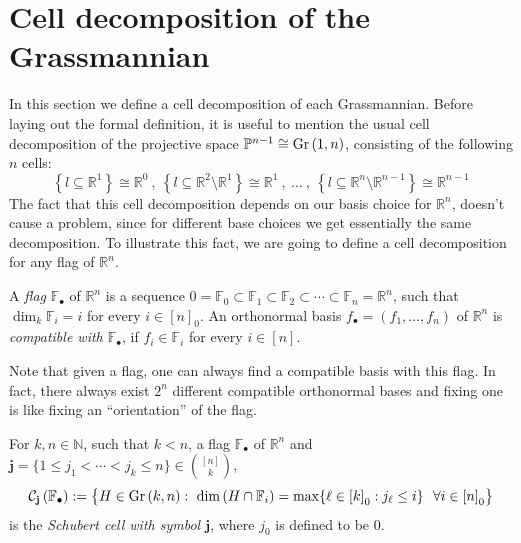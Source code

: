 \section{Cell decomposition of the Grassmannian}
In this section we define a cell decomposition of each Grassmannian. Before laying out the formal definition, it is useful to mention the usual cell decomposition of the projective space $\mathbb{P}^{n-1}\cong\Gr{1}{n}$, consisting of the following $n$ cells:
\[\left\{l\subseteq\mathbb{R}^1\right\}\cong\mathbb{R}^0\ ,\ \left\{l\subseteq\mathbb{R}^2\setminus\mathbb{R}^1\right\}\cong\mathbb{R}^1\ ,\ \ldots\ ,\ \left\{l\subseteq\mathbb{R}^n\setminus\mathbb{R}^{n-1}\right\}\cong\mathbb{R}^{n-1}\]
The fact that this cell decomposition depends on our basis choice for $\mathbb{R}^n$, doesn't cause a problem, since for different base choices we get essentially the same decomposition. To illustrate this fact, we are going to define a cell decomposition for any flag of $\mathbb{R}^n$.

\begin{definition} A \emph{flag} $\mathbb{F}_{\bullet}$ of $\mathbb{R}^n$ is a sequence $0=\mathbb{F}_0\subset\mathbb{F}_1\subset\mathbb{F}_2\subset\cdots\subset\mathbb{F}_n=\mathbb{R}^n$, such that $\dim_k\mathbb{F}_i = i$ for every $i\in[n]_0$. An orthonormal basis $f_{\bullet}=(f_1,\ldots,f_n)$ of $\mathbb{R}^n$ is \emph{compatible with $\mathbb{F}_{\bullet}$}, if $f_i\in\mathbb{F}_i$ for every $i\in[n]$.
\end{definition}

Note that given a flag, one can always find a compatible basis with this flag. In fact, there always exist $2^n$ different compatible orthonormal bases and fixing one is like fixing an ``orientation'' of the flag.

\begin{definition} For $k,n\in\mathbb{N}$, such that $k<n$, a flag $\mathbb{F}_{\bullet}$ of $\mathbb{R}^n$ and $\mathbf{j}=\{1\leq j_1<\cdots<j_k\leq n\}\in\binom{[n]}{k}$,
\[\grcell{j}:=\big\{H\in\Gr{k}{n}:\ \dim\left(H\cap\mathbb{F}_i\right)=\max\{\ell\in{[k]}_0:j_{\ell}\leq i\}\ \ \forall i\in{[n]}_0\big\}\]
is the \emph{Schubert cell with symbol $\mathbf{j}$}, where $j_0$ is defined to be $0$.
\end{definition}

